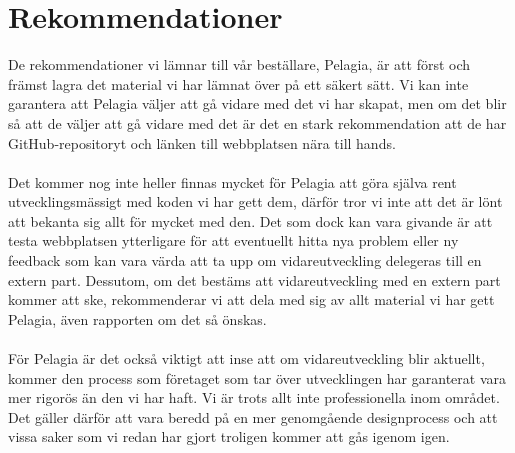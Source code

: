 \section{Rekommendationer}
De rekommendationer vi lämnar till vår beställare, Pelagia, är att först och främst lagra det material vi har lämnat över på ett säkert sätt. Vi kan inte garantera att Pelagia väljer att gå vidare med det vi har skapat, men om det blir så att de väljer att gå vidare med det är det en stark rekommendation att de har GitHub-repositoryt och länken till webbplatsen nära till hands.
\\
\\
Det kommer nog inte heller finnas mycket för Pelagia att göra själva rent utvecklingsmässigt med koden vi har gett dem, därför tror vi inte att det är lönt att bekanta sig allt för mycket med den. Det som dock kan vara givande är att testa webbplatsen ytterligare för att eventuellt hitta nya problem eller ny feedback som kan vara värda att ta upp om vidareutveckling delegeras till en extern part. Dessutom, om det bestäms att vidareutveckling med en extern part kommer att ske, rekommenderar vi att dela med sig av allt material vi har gett Pelagia, även rapporten om det så önskas.
\\
\\
För Pelagia är det också viktigt att inse att om vidareutveckling blir aktuellt, kommer den process som företaget som tar över utvecklingen har garanterat vara mer rigorös än den vi har haft. Vi är trots allt inte professionella inom området. Det gäller därför att vara beredd på en mer genomgående designprocess och att vissa saker som vi redan har gjort troligen kommer att gås igenom igen.